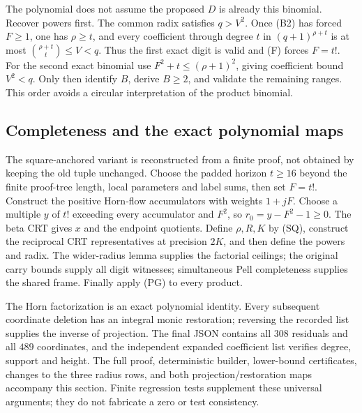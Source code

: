 The polynomial does not assume the proposed $D$ is already this binomial.
Recover powers first. The common radix satisfies $q>V^2$. Once (B2)
has forced $F\ge1$, one has $\rho\ge t$, and every coefficient through
degree $t$ in $(q+1)^{\rho+t}$ is at most
$\binom{\rho+t}{t}\le V<q$. Thus the first exact digit is valid and (F)
forces $F=t!$. For the second exact binomial use
$F^2+t\le(\rho+1)^2$, giving coefficient bound $V^2<q$.
Only then identify $B$, derive $B\ge2$, and validate the remaining ranges.
This order avoids a circular interpretation of the product binomial.

\subsection{Completeness and the exact polynomial maps}
The square-anchored variant is reconstructed from a finite proof, not
obtained by keeping the old tuple unchanged. Choose the padded horizon
$t\ge16$ beyond the finite proof-tree length, local parameters and label
sums, then set $F=t!$. Construct the positive Horn-flow accumulators with
weights $1+jF$. Choose a multiple $y$ of $t!$ exceeding every accumulator
and $F^2$, so $r_0=y-F^2-1\ge0$. The beta CRT gives $x$ and the endpoint
quotients. Define $\rho,R,K$ by (SQ), construct the reciprocal CRT
representatives at precision $2K$, and then define the powers and radix.
The wider-radius lemma supplies the factorial ceilings; the original
carry bounds supply all digit witnesses; simultaneous Pell completeness
supplies the shared frame. Finally apply (PG) to every product.

The Horn factorization is an exact polynomial identity. Every subsequent
coordinate deletion has an integral monic restoration; reversing the
recorded list supplies the inverse of projection. The final JSON contains
all $308$ residuals and all $489$ coordinates, and the independent
expanded coefficient list verifies degree, support and height. The full
proof, deterministic builder, lower-bound certificates, changes to the
three radius rows, and both projection/restoration maps accompany this
section. Finite regression tests supplement these universal arguments;
they do not fabricate a zero or test consistency.
